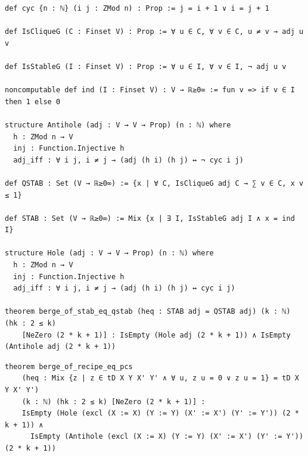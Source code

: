 \label{lean:berge-of-stab-eq-qstab}
\begin{lstlisting}
def cyc {n : ℕ} (i j : ZMod n) : Prop := j = i + 1 ∨ i = j + 1

def IsCliqueG (C : Finset V) : Prop := ∀ u ∈ C, ∀ v ∈ C, u ≠ v → adj u v

def IsStableG (I : Finset V) : Prop := ∀ u ∈ I, ∀ v ∈ I, ¬ adj u v

noncomputable def ind (I : Finset V) : V → ℝ≥0∞ := fun v => if v ∈ I then 1 else 0

structure Antihole (adj : V → V → Prop) (n : ℕ) where
  h : ZMod n → V
  inj : Function.Injective h
  adj_iff : ∀ i j, i ≠ j → (adj (h i) (h j) ↔ ¬ cyc i j)

def QSTAB : Set (V → ℝ≥0∞) := {x | ∀ C, IsCliqueG adj C → ∑ v ∈ C, x v ≤ 1}

def STAB : Set (V → ℝ≥0∞) := Mix {x | ∃ I, IsStableG adj I ∧ x = ind I}

structure Hole (adj : V → V → Prop) (n : ℕ) where
  h : ZMod n → V
  inj : Function.Injective h
  adj_iff : ∀ i j, i ≠ j → (adj (h i) (h j) ↔ cyc i j)

theorem berge_of_stab_eq_qstab (heq : STAB adj = QSTAB adj) (k : ℕ) (hk : 2 ≤ k)
    [NeZero (2 * k + 1)] : IsEmpty (Hole adj (2 * k + 1)) ∧ IsEmpty (Antihole adj (2 * k + 1))
\end{lstlisting}

\label{lean:berge-of-recipe-eq-pcs}
\begin{lstlisting}
theorem berge_of_recipe_eq_pcs
    (heq : Mix {z | z ∈ tD X Y X' Y' ∧ ∀ u, z u = 0 ∨ z u = 1} = tD X Y X' Y')
    (k : ℕ) (hk : 2 ≤ k) [NeZero (2 * k + 1)] :
    IsEmpty (Hole (excl (X := X) (Y := Y) (X' := X') (Y' := Y')) (2 * k + 1)) ∧
      IsEmpty (Antihole (excl (X := X) (Y := Y) (X' := X') (Y' := Y')) (2 * k + 1))
\end{lstlisting}

